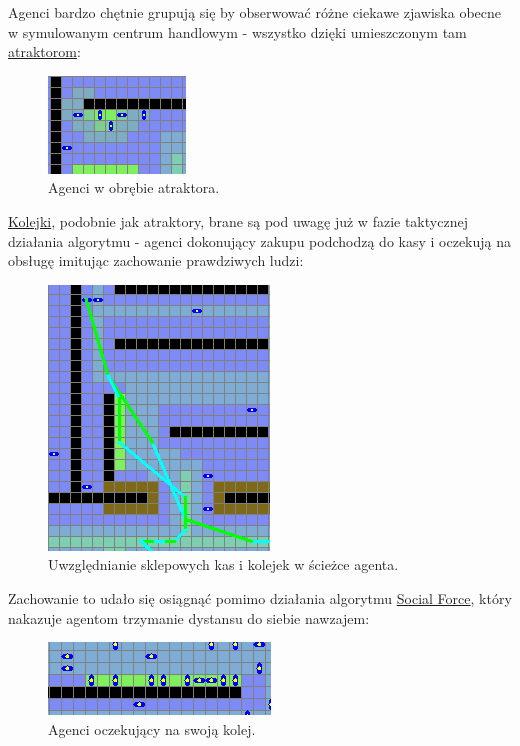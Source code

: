 \documentclass[a4paper, 12pt]{article}
\begin{document}
\noindent
Agenci bardzo chętnie grupują się by obserwować różne ciekawe zjawiska obecne w symulowanym centrum handlowym - wszystko dzięki umieszczonym tam \hyperref[sec:attractors]{atraktorom}:

        \begin{figure}[H]
          \centering
          \includegraphics[scale=0.7]{./img/attraction3.png}
          \caption{Agenci w obrębie atraktora.}
          \label{fig:res-attraction-3}
        \end{figure}

\hyperref[sec:queues]{Kolejki}, podobnie jak atraktory, brane są pod uwagę już w fazie taktycznej działania algorytmu - agenci dokonujący zakupu podchodzą do kasy i oczekują na obsługę imitując zachowanie prawdziwych ludzi:

        \begin{figure}[H]
          \centering
          \includegraphics[scale=0.7]{./img/queueing.png}
          \caption{Uwzględnianie sklepowych kas i kolejek w ścieżce agenta.}
          \label{fig:res-queueing}
        \end{figure}

\noindent
Zachowanie to udało się osiągnąć pomimo działania algorytmu \hyperref[sec:operational]{Social Force}, który nakazuje agentom trzymanie dystansu do siebie nawzajem:

        \begin{figure}[H]
          \centering
          \includegraphics[scale=0.7]{./img/queueing2.png}
          \caption{Agenci oczekujący na swoją kolej.}
          \label{fig:res-queueing-2}
        \end{figure}
\end{document}
